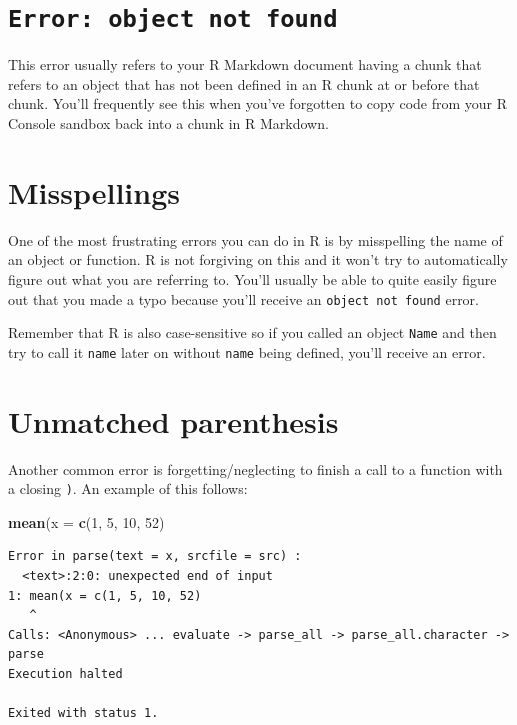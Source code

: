 \documentclass[]{tufte-book}
\newenvironment{Shaded}{\begin{snugshade}}{\end{snugshade}}
\newcommand{\KeywordTok}[1]{\textcolor[rgb]{0.13,0.29,0.53}{\textbf{{#1}}}}
\newcommand{\DataTypeTok}[1]{\textcolor[rgb]{0.13,0.29,0.53}{{#1}}}
\newcommand{\DecValTok}[1]{\textcolor[rgb]{0.00,0.00,0.81}{{#1}}}
\newcommand{\NormalTok}[1]{{#1}}
\theoremstyle{definition}
\theoremstyle{definition}
\theoremstyle{remark}
\begin{document}
\section{\texorpdfstring{\texttt{Error:\ object\ not\ found}}{Error: object not found}}\label{error-object-not-found}

This error usually refers to your R Markdown document having a chunk
that refers to an object that has not been defined in an R chunk at or
before that chunk. You'll frequently see this when you've forgotten to
copy code from your R Console sandbox back into a chunk in R Markdown.

\section{Misspellings}\label{misspellings}

One of the most frustrating errors you can do in R is by misspelling the
name of an object or function. R is not forgiving on this and it won't
try to automatically figure out what you are referring to. You'll
usually be able to quite easily figure out that you made a typo because
you'll receive an \texttt{object\ not\ found} error.

Remember that R is also case-sensitive so if you called an object
\texttt{Name} and then try to call it \texttt{name} later on without
\texttt{name} being defined, you'll receive an error.

\section{Unmatched parenthesis}\label{unmatched-parenthesis}

Another common error is forgetting/neglecting to finish a call to a
function with a closing \texttt{)}. An example of this follows:

\begin{Shaded}
\begin{Highlighting}[]
\KeywordTok{mean}\NormalTok{(}\DataTypeTok{x =} \KeywordTok{c}\NormalTok{(}\DecValTok{1}\NormalTok{, }\DecValTok{5}\NormalTok{, }\DecValTok{10}\NormalTok{, }\DecValTok{52}\NormalTok{)}
\end{Highlighting}
\end{Shaded}

\begin{verbatim}
Error in parse(text = x, srcfile = src) : 
  <text>:2:0: unexpected end of input
1: mean(x = c(1, 5, 10, 52)
   ^
Calls: <Anonymous> ... evaluate -> parse_all -> parse_all.character -> parse
Execution halted

Exited with status 1.
\end{verbatim}
\end{document}
